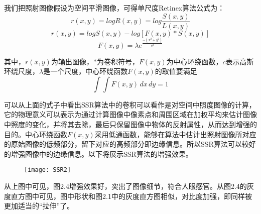 我们把照射图像假设为空间平滑图像，可得单尺度Retinex算法公式为：
\begin{equation}     r(x,y)=logR(x,y)=log \frac{S(x,y)}{L(x,y)}    \end{equation}
\begin{equation}     r(x,y)=logS(x,y)-log \left[ F(x,y)*S(x,y) \right]    \end{equation}	
\begin{equation}     F(x,y)=\lambda e^{\frac{-(x^2+y^2)}{c^2}}    \end{equation}	

其中，$r(x,y)$为输出图像，$*$为卷积符号，$F(x,y)$为中心环绕函数，$c$表示高斯环绕尺度，$\lambda$是一个尺度，中心环绕函数$F(x,y)$的取值要满足
\begin{equation}     \int\int F(x,y)\,dx \,dy=1    \end{equation}

可以从上面的式子中看出SSR算法中的卷积可以看作是对空间中照度图像的计算，它的物理意义可以表示为通过计算图像中像素点和周围区域在加权平均来估计图像中照度的变化，并将其去除，最后只保留图像中物体的反射属性，从而达到增强的目的。中心环绕函数$F(x,y)$采用低通函数，能够在算法中估计出照射图像所对应的原始图像的低频部分，留下对应的高频部分即边缘信息。所以SSR算法可以较好的增强图像中的边缘信息。以下将展示SSR算法的增强效果。

\begin{figure}[!htbp]
    \centering
    \texttt{[image: SSR2]}
    \label{fig:tc_q_criteria}
\end{figure}


从上图中可见，图2.4增强效果好，突出了图像细节，符合人眼感官。从图2.4的灰度直方图中可见，图中形状和图2.1中的灰度直方图相似，对比度加强，即同样被更加适当的“拉伸”了。